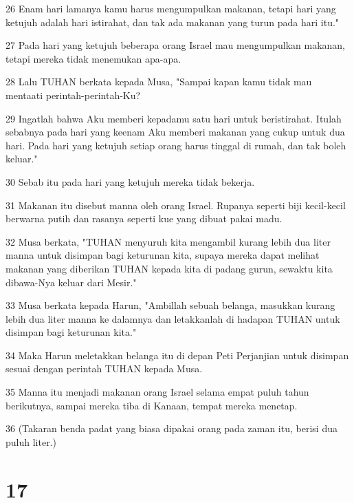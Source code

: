 \par 26 Enam hari lamanya kamu harus mengumpulkan makanan, tetapi hari yang ketujuh adalah hari istirahat, dan tak ada makanan yang turun pada hari itu."
\par 27 Pada hari yang ketujuh beberapa orang Israel mau mengumpulkan makanan, tetapi mereka tidak menemukan apa-apa.
\par 28 Lalu TUHAN berkata kepada Musa, "Sampai kapan kamu tidak mau mentaati perintah-perintah-Ku?
\par 29 Ingatlah bahwa Aku memberi kepadamu satu hari untuk beristirahat. Itulah sebabnya pada hari yang keenam Aku memberi makanan yang cukup untuk dua hari. Pada hari yang ketujuh setiap orang harus tinggal di rumah, dan tak boleh keluar."
\par 30 Sebab itu pada hari yang ketujuh mereka tidak bekerja.
\par 31 Makanan itu disebut manna oleh orang Israel. Rupanya seperti biji kecil-kecil berwarna putih dan rasanya seperti kue yang dibuat pakai madu.
\par 32 Musa berkata, "TUHAN menyuruh kita mengambil kurang lebih dua liter manna untuk disimpan bagi keturunan kita, supaya mereka dapat melihat makanan yang diberikan TUHAN kepada kita di padang gurun, sewaktu kita dibawa-Nya keluar dari Mesir."
\par 33 Musa berkata kepada Harun, "Ambillah sebuah belanga, masukkan kurang lebih dua liter manna ke dalamnya dan letakkanlah di hadapan TUHAN untuk disimpan bagi keturunan kita."
\par 34 Maka Harun meletakkan belanga itu di depan Peti Perjanjian untuk disimpan sesuai dengan perintah TUHAN kepada Musa.
\par 35 Manna itu menjadi makanan orang Israel selama empat puluh tahun berikutnya, sampai mereka tiba di Kanaan, tempat mereka menetap.
\par 36 (Takaran benda padat yang biasa dipakai orang pada zaman itu, berisi dua puluh liter.)

\chapter{17}


